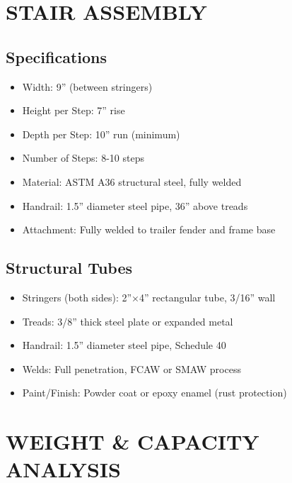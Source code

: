 \documentclass[11pt,letter]{article}
\begin{document}
\section{STAIR ASSEMBLY}

\subsection{Specifications}
\begin{itemize}
  \item Width: 9'' (between stringers)
  \item Height per Step: 7'' rise
  \item Depth per Step: 10'' run (minimum)
  \item Number of Steps: 8-10 steps
  \item Material: ASTM A36 structural steel, fully welded
  \item Handrail: 1.5'' diameter steel pipe, 36'' above treads
  \item Attachment: Fully welded to trailer fender and frame base
\end{itemize}

\subsection{Structural Tubes}
\begin{itemize}
  \item Stringers (both sides): 2''×4'' rectangular tube, 3/16'' wall
  \item Treads: 3/8'' thick steel plate or expanded metal
  \item Handrail: 1.5'' diameter steel pipe, Schedule 40
  \item Welds: Full penetration, FCAW or SMAW process
  \item Paint/Finish: Powder coat or epoxy enamel (rust protection)
\end{itemize}

\section{WEIGHT \& CAPACITY ANALYSIS}
\end{document}
